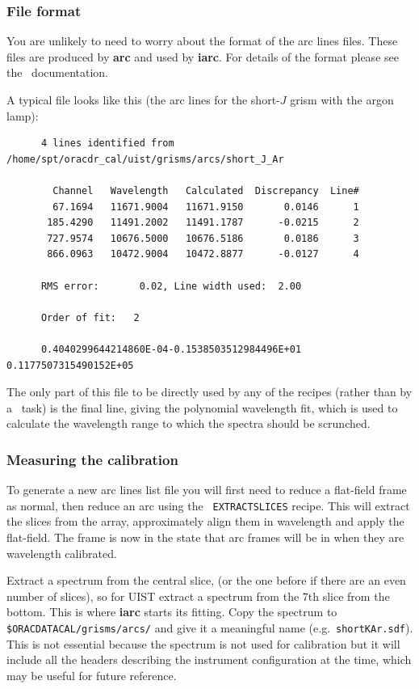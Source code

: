 \documentclass[twoside,11pt]{article}
\newcommand{\xref}[3]{#1}
\renewcommand{\_}{\texttt{\symbol{95}}}
\newcommand{\FIGARO}{\xref{{\sc{Figaro}}}{sun86}{}}
\begin{document}
\subsubsection{File format}

You are unlikely to need to worry about the format of the arc lines
files. These files are produced by \xref{{\bf arc}}{sun86}{ARC} and
used by \xref{{\bf iarc}}{sun86}{IARC}. For details of the format
please see the \FIGARO\ documentation.

A typical file looks like this (the arc lines for the short-$J$ grism
with the argon lamp):

\begin{verbatim}
      4 lines identified from /home/spt/oracdr_cal/uist/grisms/arcs/short_J_Ar

        Channel   Wavelength   Calculated  Discrepancy  Line#
        67.1694   11671.9004   11671.9150       0.0146      1    
       185.4290   11491.2002   11491.1787      -0.0215      2    
       727.9574   10676.5000   10676.5186       0.0186      3    
       866.0963   10472.9004   10472.8877      -0.0127      4    

      RMS error:       0.02, Line width used:  2.00

      Order of fit:   2

      0.4040299644214860E-04-0.1538503512984496E+01 0.1177507315490152E+05
\end{verbatim}

The only part of this file to be directly used by any of the recipes
(rather than by a \FIGARO\ task) is the final line, giving the
polynomial wavelength fit, which is used to calculate the wavelength
range to which the spectra should be scrunched.

\subsubsection{Measuring the calibration}

To generate a new arc lines list file you will first need to reduce a
flat-field frame as normal, then reduce an arc using the {\tt
  EXTRACT\_SLICES} recipe. This will extract the slices from the
array, approximately align them in wavelength and apply the
flat-field. The frame is now in the state that arc frames will be in
when they are wavelength calibrated. 

Extract a spectrum from the central slice, (or the one before if there
are an even number of slices), so for UIST extract a spectrum from the
7th slice from the bottom. This is where \xref{{\bf
    iarc}}{sun86}{IARC} starts its fitting. Copy the spectrum to {\tt
  \$ORAC\_DATA\_CAL/grisms/arcs/} and give it a meaningful name (e.g.\ 
{\tt short\_K\_Ar.sdf}). This is not essential because the spectrum is
not used for calibration but it will include all the headers
describing the instrument configuration at the time, which may be
useful for future reference.
\end{document}
